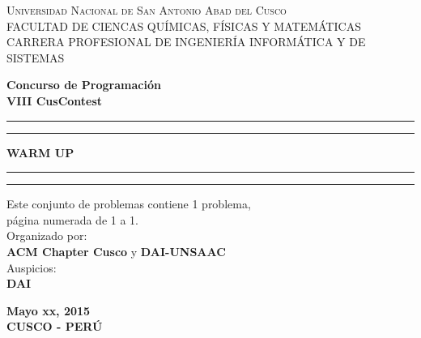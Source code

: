 \documentclass[12pt,oneside,a4paper]{book}
\theoremstyle{definition}
\begin{document}
\vspace*{1in}
\begin{center}
\textsc{\large Universidad Nacional de San Antonio Abad del Cusco}\\\vspace*{0.04in}
\textsc{FACULTAD DE CIENCAS QUÍMICAS, FÍSICAS Y MATEMÁTICAS}\\
\vspace*{0.04in}
CARRERA PROFESIONAL DE INGENIERÍA INFORMÁTICA Y DE SISTEMAS \\
\captionsetup[figure]{labelformat=empty}

\vspace*{2in}
\newcommand{\topline}{
\rule{164.7mm}{2mm}
\vspace*{-0.18in}
\hrule
}
\newcommand{\downline}{
\hrule
\vspace*{0.02in}
\rule{164.7mm}{2mm}
}
\vspace*{-0.6in}
\textbf{Concurso de Programación}\\
\textbf{VIII CusContest}\\
\vspace*{0.8in}
\topline
\vspace*{0.1in}
\begin{large}
\textbf{WARM UP} \\
\end{large}
\vspace*{0.08in}
\downline
\vspace*{0.55in}

\begin{minipage}{\linewidth}
\large
\begin{minipage}{0.45\linewidth}
\end{minipage}
\hspace{0.28\linewidth}
\begin{minipage}{0.8\linewidth}
\begin{normalsize}
Este conjunto de problemas contiene 1 problema,\\ página numerada de 1 a 1.\vspace*{0.5in}
\\Organizado por:\vspace*{-0.05in}
\\\textbf{ACM Chapter Cusco} y \textbf{DAI-UNSAAC}\\
Auspicios:\vspace*{-0.05in}
\\\textbf{DAI}\\\vspace*{0.5in}
\end{normalsize}
\end{minipage}
\end{minipage}
\vspace*{0.6in}
{
\textbf{Mayo xx, 2015}\\ \vspace*{-0.6in}
\textbf{CUSCO - PERÚ}
}
\end{center}
\end{document}
